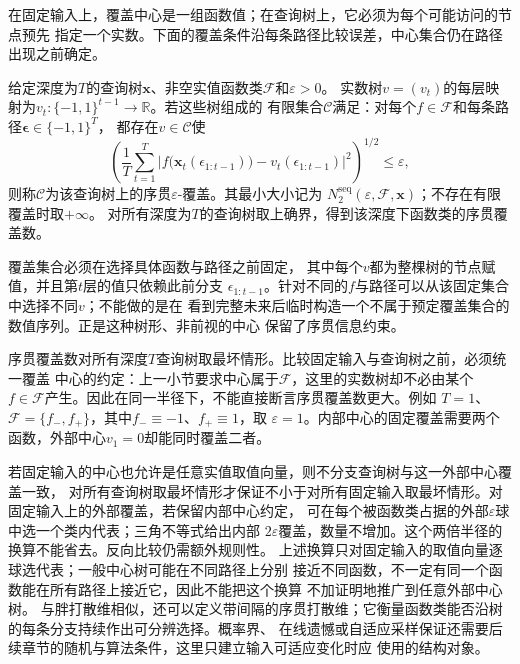 在固定输入上，覆盖中心是一组函数值；在查询树上，它必须为每个可能访问的节点预先
指定一个实数。下面的覆盖条件沿每条路径比较误差，中心集合仍在路径出现之前确定。
\begin{definition}[序贯覆盖与序贯覆盖数]
\label{def:functional-sequential-cover}
给定深度为$T$的查询树$\bm x$、非空实值函数类$\mathcal F$和$\varepsilon>0$。
实数树$v=(v_t)$的每层映射为$v_t:\{-1,1\}^{t-1}\to\mathbb R$。若这些树组成的
有限集合$\mathcal C$满足：对每个$f\in\mathcal F$和每条路径$\bm\epsilon\in\{-1,1\}^T$，
都存在$v\in\mathcal C$使
\begin{equation}
  \left(
    \frac1T\sum_{t=1}^{T}
    \left|
      f\bigl(\bm{x}_t(\epsilon_{1:t-1})\bigr)
      -
      v_t(\epsilon_{1:t-1})
    \right|^2
  \right)^{1/2}
  \leq\varepsilon,
  \label{eq:functional-sequential-cover}
\end{equation}
则称$\mathcal C$为该查询树上的序贯$\varepsilon$-覆盖。其最小大小记为
$N_2^{\mathrm{seq}}(\varepsilon,\mathcal F,\bm x)$；不存在有限覆盖时取$+\infty$。
对所有深度为$T$的查询树取上确界，得到该深度下函数类的序贯覆盖数。
\end{definition}
覆盖集合必须在选择具体函数与路径之前固定，
其中每个$v$都为整棵树的节点赋值，并且第$t$层的值只依赖此前分支
$\epsilon_{1:t-1}$。针对不同的$f$与路径可以从该固定集合中选择不同$v$；不能做的是在
看到完整未来后临时构造一个不属于预定覆盖集合的数值序列。正是这种树形、非前视的中心
保留了序贯信息约束。

序贯覆盖数对所有深度$T$查询树取最坏情形。比较固定输入与查询树之前，必须统一覆盖
中心的约定：上一小节要求中心属于$\mathcal F$，这里的实数树却不必由某个
$f\in\mathcal F$产生。因此在同一半径下，不能直接断言序贯覆盖数更大。例如
$T=1$、$\mathcal F=\{f_-,f_+\}$，其中$f_-\equiv-1$、$f_+\equiv1$，取
$\varepsilon=1$。内部中心的固定覆盖需要两个函数，外部中心$v_1=0$却能同时覆盖二者。

若固定输入的中心也允许是任意实值取值向量，则不分支查询树与这一外部中心覆盖一致，
对所有查询树取最坏情形才保证不小于对所有固定输入取最坏情形。对固定输入上的外部覆盖，若保留内部中心约定，
可在每个被函数类占据的外部$\varepsilon$球中选一个类内代表；三角不等式给出内部
$2\varepsilon$覆盖，数量不增加。这个两倍半径的换算不能省去。反向比较仍需额外规则性。
上述换算只对固定输入的取值向量逐球选代表；一般中心树可能在不同路径上分别
接近不同函数，不一定有同一个函数能在所有路径上接近它，因此不能把这个换算
不加证明地推广到任意外部中心树。
与胖打散维相似，还可以定义带间隔的序贯打散维；它衡量函数类能否沿树的每条分支持续作出可分辨选择。概率界、
在线遗憾或自适应采样保证还需要后续章节的随机与算法条件，这里只建立输入可适应变化时应
使用的结构对象。

